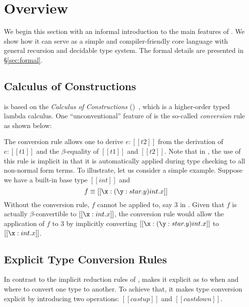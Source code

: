 \section{Overview}


We begin this section with an informal introduction to the main features of \name. We show how it can serve as a simple and compiler-friendly core language with general recursion and decidable type system. The formal details are presented in \S\ref{sec:formal}.

\subsection{Calculus of Constructions}
\label{sec:coc}

\name is based on the \emph{Calculus of Constructions} (\coc)~\cite{coc}, which is a higher-order typed lambda calculus. One ``unconventional'' feature of \coc is the so-called \emph{conversion} rule as shown below:
\renewcommand{\ottpremise}[1]{\enskip #1 \enskip}
\ottusedrule{\ottdruleTccXXConv{}}

The conversion rule allows one to derive $e:[[t2]]$ from the derivation of $e:[[t1]]$ and the $\beta$-equality of $[[t1]]$ and $[[t2]]$. Note that in \coc, the use of this rule is implicit in that it is automatically applied during type checking to all non-normal form terms. To illustrate, let us consider a simple example. Suppose we have a built-in base type $[[int]]$ and \[f \equiv [[\x:(\y:star.y)int.x]] \] Without the conversion rule, $f$ cannot be applied to, say $3$ in \coc. Given that $f$ is actually $\beta$-convertible to $[[\x:int.x]]$, the conversion rule would allow the application of $f$ to $3$ by implicitly converting $[[\x:(\y:star.y)int.x]]$ to $[[\x:int.x]]$.

\subsection{Explicit Type Conversion Rules}


In contrast to the implicit reduction rules of \coc, \name makes it explicit as to when and where to convert one type to another. To achieve that, it makes type conversion explicit by introducing two operations: $[[castup]]$ and $[[castdown]]$.

